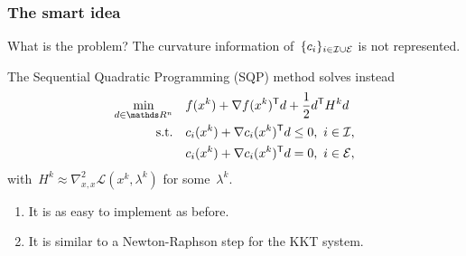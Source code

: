 \documentclass{polyu-presentation}
\newcommand{\con}[1]{c_{#1}}
\newcommand{\ieq}{\mathcal{E}}
\newcommand{\iub}{\mathcal{I}}
\newcommand{\lag}{\mathcal{L}}
\newcommand{\obj}{f}
\begin{document}
\begin{frame}
    \frametitle{The smart idea}

    \begin{block}{What is the problem?}
        The \alert{curvature information} of~$\set{\con{i}}_{i \in \iub \cup \ieq}$ is not represented.
    \end{block}

    \medskip

    The \alert{Sequential Quadratic Programming} (SQP) method solves instead
    \begin{align*}
        \min_{d \in \R^n}   & \quad \obj(x^k) + \nabla \obj(x^k)^{\T} d + \frac{1}{2} d^{\T} H^k d\\
        \text{s.t.}         & \quad \con{i}(x^k) + \nabla \con{i}(x^k)^{\T} d \le 0, ~ i \in \iub,\\
                            & \quad \con{i}(x^k) + \nabla \con{i}(x^k)^{\T} d = 0, ~ i \in \ieq,
    \end{align*}
    with~$H^k \approx \nabla_{x, x}^2 \lag(x^k, \lambda^k)$ for some~$\lambda^k$.

    \medskip

    \begin{block}{}
        \begin{enumerate}[<+(1)->]
            \item It is as easy to \alert{implement} as before.
            \item It is similar to a \alert{Newton-Raphson} step for the \alert{KKT system}.
        \end{enumerate}
    \end{block}
\end{frame}
\end{document}

